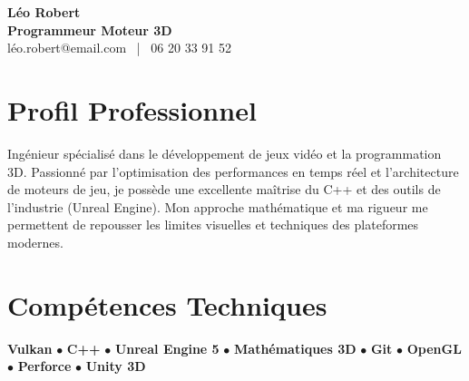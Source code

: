 \documentclass[11pt,a4paper]{article}
\begin{document}
\begin{center}
    {\Huge \textbf{Léo Robert}} \\[0.2cm]
    {\Large \textbf{Programmeur Moteur 3D}} \\[0.1cm]
    léo.robert@email.com \ | \ 06 20 33 91 52
\end{center}

\vspace{0.3cm}

\section*{Profil Professionnel}
\noindent
Ingénieur spécialisé dans le développement de jeux vidéo et la programmation 3D. Passionné par l'optimisation des performances en temps réel et l'architecture de moteurs de jeu, je possède une excellente maîtrise du C++ et des outils de l'industrie (Unreal Engine). Mon approche mathématique et ma rigueur me permettent de repousser les limites visuelles et techniques des plateformes modernes.

\vspace{0.3cm}

\section*{Compétences Techniques}
\noindent
\textbf{Vulkan} $\bullet$ \textbf{C++} $\bullet$ \textbf{Unreal Engine 5} $\bullet$ \textbf{Mathématiques 3D} $\bullet$ \textbf{Git} $\bullet$ \textbf{OpenGL} $\bullet$ \textbf{Perforce} $\bullet$ \textbf{Unity 3D}

\vspace{0.3cm}

\end{document}

